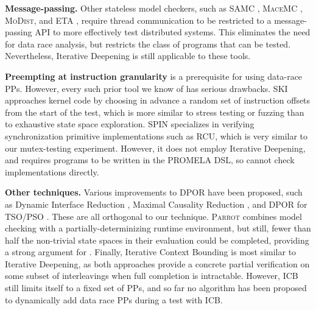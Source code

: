 \documentclass[pldi]{sigplanconf-pldi15}
\begin{document}
{\bf Message-passing.} Other stateless model checkers, such as SAMC \cite{samc}, \textsc{MaceMC} \cite{macemc}, \textsc{MoDist}, and ETA \cite{parallel-dpor}, require thread communication to be restricted to a message-passing API to more effectively test distributed systems.
This eliminates the need for data race analysis, but restricts the class of programs that can be tested.
Nevertheless, Iterative Deepening is still applicable to these tools.

{\bf Preempting at instruction granularity} is a prerequisite for using data-race PPs. However, every such prior tool we know of has serious drawbacks.
SKI \cite{ski} approaches kernel code by choosing in advance a random set of instruction offsets from the start of the test,
which is more similar to stress testing or fuzzing than to exhaustive state space exploration.
SPIN \cite{spin} specializes in verifying synchronization primitive implementations such as RCU, which is very similar to our mutex-testing experiment.
However, it does not employ Iterative Deepening, and requires programs to be written in the PROMELA DSL, so cannot check implementations directly.

{\bf Other techniques.} Various improvements to DPOR have been proposed, such as Dynamic Interface Reduction \cite{demeter}, Maximal Causality Reduction \cite{mcr}, and DPOR for TSO/PSO \cite{tsopso}.
These are all orthogonal to our technique.
\textsc{Parrot} \cite{parrot} combines model checking with a partially-determinizing runtime environment, but still, fewer than half the non-trivial state spaces in their evaluation could be completed, providing a strong argument for \quicksand.
Finally, Iterative Context Bounding \cite{chess} is most similar to Iterative Deepening, as both approaches provide a concrete partial verification on some subset of interleavings when full completion is intractable.
However, ICB still limits itself to a fixed set of PPs, and so far no algorithm has been proposed to dynamically add data race PPs during a test with ICB.



\end{document}
